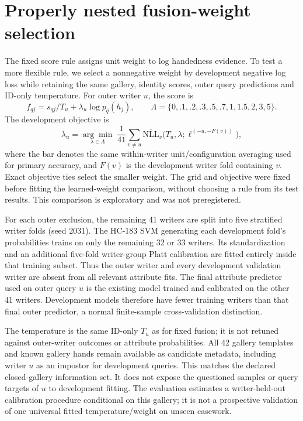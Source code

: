 \documentclass[10pt,a4paper]{article}
\begin{document}
\section{Properly nested fusion-weight selection}
\label{sec:supnested}
The fixed score rule assigns unit weight to log handedness evidence. To test a more flexible rule, we select a nonnegative weight by development negative log loss while retaining the same gallery, identity scores, outer query predictions and ID-only temperature. For outer writer $u$, the score is
\[
 f_{qj}=s_{qj}/T_u+\lambda_u\log p_q(h_j),\qquad
 \Lambda=\{0,.1,.2,.3,.5,.7,1,1.5,2,3,5\}.
\]
The development objective is
\[
 \lambda_u=\underset{\lambda\in\Lambda}{\arg\min}\;
 \frac1{41}\sum_{v\ne u}\overline{\mathrm{NLL}}_v
 \big(T_u,\lambda;\ell^{(-u,-F(v))}\big),
\]
where the bar denotes the same within-writer unit/configuration averaging used for primary accuracy, and $F(v)$ is the development writer fold containing $v$. Exact objective ties select the smaller weight. The grid and objective were fixed before fitting the learned-weight comparison, without choosing a rule from its test results. This comparison is exploratory and was not preregistered.

For each outer exclusion, the remaining 41 writers are split into five stratified writer folds (seed 2031). The HC-183 SVM generating each development fold's probabilities trains on only the remaining 32 or 33 writers. Its standardization and an additional five-fold writer-group Platt calibration are fitted entirely inside that training subset. Thus the outer writer and every development validation writer are absent from all relevant attribute fits. The final attribute predictor used on outer query $u$ is the existing model trained and calibrated on the other 41 writers. Development models therefore have fewer training writers than that final outer predictor, a normal finite-sample cross-validation distinction.

The temperature is the same ID-only $T_u$ as for fixed fusion; it is not retuned against outer-writer outcomes or attribute probabilities. All 42 gallery templates and known gallery hands remain available as candidate metadata, including writer $u$ as an impostor for development queries. This matches the declared closed-gallery information set. It does not expose the questioned samples or query targets of $u$ to development fitting. The evaluation estimates a writer-held-out calibration procedure conditional on this gallery; it is not a prospective validation of one universal fitted temperature/weight on unseen casework.
\end{document}
